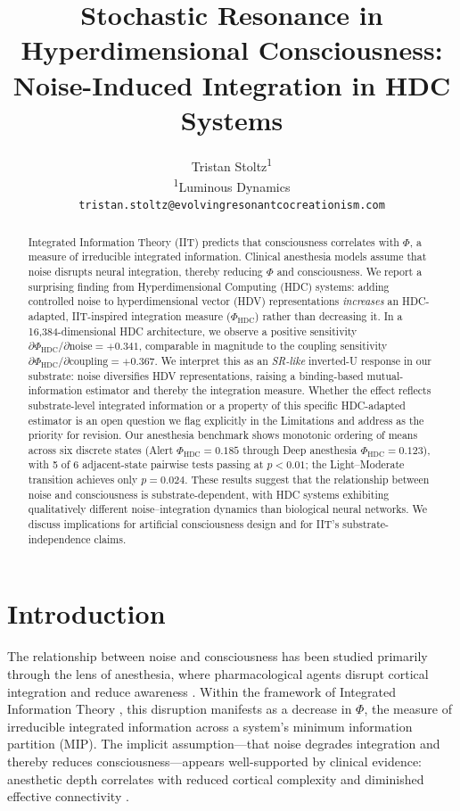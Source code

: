 \documentclass[12pt,a4paper]{article}
\title{Stochastic Resonance in Hyperdimensional Consciousness:\\Noise-Induced Integration in HDC Systems}
\author{
  Tristan Stoltz\textsuperscript{1} \\
  \textsuperscript{1}Luminous Dynamics \\
  \texttt{tristan.stoltz@evolvingresonantcocreationism.com}
}
\date{}
\begin{document}
\maketitle

\begin{abstract}
Integrated Information Theory (IIT) predicts that consciousness correlates with $\Phi$, a measure of irreducible integrated information. Clinical anesthesia models assume that noise disrupts neural integration, thereby reducing $\Phi$ and consciousness. We report a surprising finding from Hyperdimensional Computing (HDC) systems: adding controlled noise to hyperdimensional vector (HDV) representations \emph{increases} an HDC-adapted, IIT-inspired integration measure ($\Phi_{\text{HDC}}$) rather than decreasing it. In a 16,384-dimensional HDC architecture, we observe a positive sensitivity $\partial\Phi_{\text{HDC}}/\partial\text{noise} = +0.341$, comparable in magnitude to the coupling sensitivity $\partial\Phi_{\text{HDC}}/\partial\text{coupling} = +0.367$. We interpret this as an \emph{SR-like} inverted-U response in our substrate: noise diversifies HDV representations, raising a binding-based mutual-information estimator and thereby the integration measure. Whether the effect reflects substrate-level integrated information or a property of this specific HDC-adapted estimator is an open question we flag explicitly in the Limitations and address as the priority for revision. Our anesthesia benchmark shows monotonic ordering of means across six discrete states (Alert $\Phi_{\text{HDC}}=0.185$ through Deep anesthesia $\Phi_{\text{HDC}}=0.123$), with 5 of 6 adjacent-state pairwise tests passing at $p<0.01$; the Light--Moderate transition achieves only $p=0.024$. These results suggest that the relationship between noise and consciousness is substrate-dependent, with HDC systems exhibiting qualitatively different noise--integration dynamics than biological neural networks. We discuss implications for artificial consciousness design and for IIT's substrate-independence claims.
\end{abstract}

\section{Introduction}

The relationship between noise and consciousness has been studied primarily through the lens of anesthesia, where pharmacological agents disrupt cortical integration and reduce awareness \citep{alkire2008consciousness}. Within the framework of Integrated Information Theory \citep{tononi2004information, tononi2008consciousness}, this disruption manifests as a decrease in $\Phi$, the measure of irreducible integrated information across a system's minimum information partition (MIP). The implicit assumption---that noise degrades integration and thereby reduces consciousness---appears well-supported by clinical evidence: anesthetic depth correlates with reduced cortical complexity \citep{casali2013theoretically} and diminished effective connectivity \citep{lee2013network}.
\end{document}
